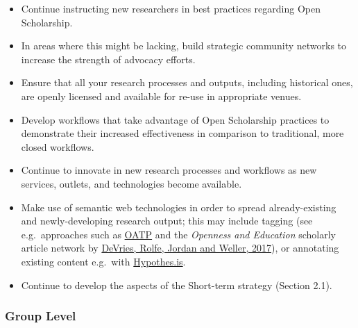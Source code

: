 \begin{itemize}
\item
  Continue instructing new researchers in best practices regarding Open
  Scholarship.
\item
  In areas where this might be lacking, build strategic community
  networks to increase the strength of advocacy efforts.
\item
  Ensure that all your research processes and outputs, including
  historical ones, are openly licensed and available for re-use in
  appropriate venues.
\item
  Develop workflows that take advantage of Open Scholarship practices to
  demonstrate their increased effectiveness in comparison to
  traditional, more closed workflows.
\item
  Continue to innovate in new research processes and workflows as new
  services, outlets, and technologies become available.
\item
  Make use of semantic web technologies in order to spread
  already-existing and newly-developing research output; this may
  include tagging (see e.g.~approaches such as
  \href{https://tagteam.harvard.edu/hubs/oatp/items}{OATP} and the
  \emph{Openness and Education} scholarly article network by
  \href{http://www.katyjordan.com/go_gn/network/}{DeVries, Rolfe, Jordan
  and Weller, 2017}), or annotating existing content e.g.~with
  \href{https://hypothes.is}{Hypothes.is}.
\item
  Continue to develop the aspects of the Short-term strategy (Section
  2.1).
\end{itemize}

\subsubsection{Group Level}\label{group-level}

